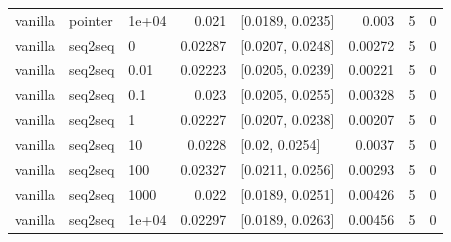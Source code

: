 \documentclass[10pt]{article}
\begin{document}
{\begin{longtable}{lllrlrrr}
vanilla & pointer & 1e+04 & 0.021 & [0.0189, 0.0235] & 0.003 & 5 & 0\\
vanilla & seq2seq & 0 & 0.02287 & [0.0207, 0.0248] & 0.00272 & 5 & 0\\
vanilla & seq2seq & 0.01 & 0.02223 & [0.0205, 0.0239] & 0.00221 & 5 & 0\\
vanilla & seq2seq & 0.1 & 0.023 & [0.0205, 0.0255] & 0.00328 & 5 & 0\\
vanilla & seq2seq & 1 & 0.02227 & [0.0207, 0.0238] & 0.00207 & 5 & 0\\
vanilla & seq2seq & 10 & 0.0228 & [0.02, 0.0254] & 0.0037 & 5 & 0\\
vanilla & seq2seq & 100 & 0.02327 & [0.0211, 0.0256] & 0.00293 & 5 & 0\\
vanilla & seq2seq & 1000 & 0.022 & [0.0189, 0.0251] & 0.00426 & 5 & 0\\
vanilla & seq2seq & 1e+04 & 0.02297 & [0.0189, 0.0263] & 0.00456 & 5 & 0\\
\bottomrule
\end{longtable}
}
\end{document}
